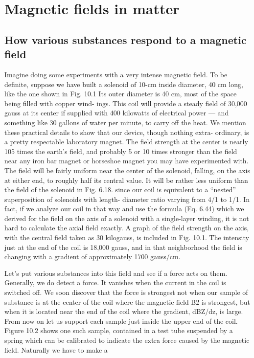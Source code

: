 \chapter{Magnetic fields in matter}

\iffalse

\section{How various substances respond to a magnetic field}

Imagine doing some experiments with a very intense magnetic
field. To be definite, suppose we have built a solenoid of 10-cm inside
diameter, 40 cm long, like the one shown in Fig. 10.1 Its outer
diameter is 40 cm, most of the space being filled with copper wind-
ings. This coil will provide a steady field of 30,000 gauss at its center
if supplied with 400 kilowatts of electrical power --- and something
like 30 gallons of water per minute, to carry off the heat. We mention
these practical details to show that our device, though nothing extra-
ordinary, is a pretty respectable laboratory magnet. The field
strength at the center is nearly 105 times the earth's field, and probably
5 or 10 times stronger than the field near any iron bar magnet
or horseshoe magnet you may have experimented with. The field
will be fairly uniform near the center of the solenoid, falling, on the
axis at either end, to roughly half its central value. It will be rather
less uniform than the field of the solenoid in Fig. 6.18. since our coil
is equivalent to a ``nested'' superposition of solenoids with length-
diameter ratio varying from 4/1 to 1/1. In fact, if we analyze our
coil in that way and use the formula (Eq. 6.44) which we derived for
the field on the axis of a solenoid with a single-layer winding, it is
not hard to calculate the axial field exactly. A graph of the field
strength on the axis, with the central field taken as 30 kilogauss, is
included in Fig. 10.1. The intensity just at the end of the coil is
18,000 gauss, and in that neighborhood the field is changing with a
gradient of approximately 1700 gauss/cm.

Let's put various substances into this field and see if a force acts
on them. Generally, we do detect a force. It vanishes when the
current in the coil is switched off. We soon discover that the force
is strongest not when our sample of substance is at the center of the
coil where the magnetic field B2 is strongest, but when it is located
near the end of the coil where the gradient, dBZ/dz, is large. From
now on let us support each sample just inside the upper end of the
coil. Figure 10.2 shows one such sample, contained in a test tube
suspended by a spring which can be calibrated to indicate the extra
force caused by the magnetic field. Naturally we have to make a

